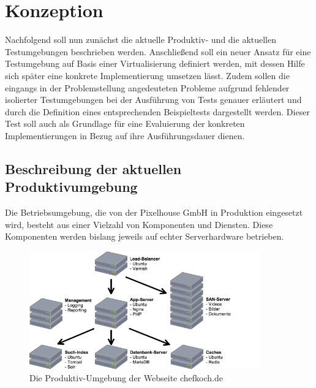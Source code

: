 \section{Konzeption}

Nachfolgend soll nun zunächst die aktuelle Produktiv- und die aktuellen Testumgebungen beschrieben werden. Anschließend soll ein neuer Ansatz für eine Testumgebung auf Basis einer Virtualisierung definiert werden, mit dessen Hilfe sich später eine konkrete Implementierung umsetzen lässt. Zudem sollen die eingangs in der Problemstellung angedeuteten Probleme aufgrund fehlender isolierter Testumgebungen bei der Ausführung von Tests genauer erläutert und durch die Definition eines entsprechenden Beispieltests dargestellt werden. Dieser Test soll auch als Grundlage für eine Evaluierung der konkreten Implementierungen in Bezug auf ihre Ausführungsdauer dienen.

\subsection{Beschreibung der aktuellen Produktivumgebung}

Die Betriebsumgebung, die von der Pixelhouse GmbH in Produktion eingesetzt wird, besteht aus einer Vielzahl von Komponenten und Diensten. Diese Komponenten werden bislang jeweils auf echter Serverhardware betrieben.

\begin{figure}[!ht]
  \begin{center}
    \includegraphics[width=10cm]{bilder/Produktiv-Umgebung.png}
    \caption{Die Produktiv-Umgebung der Webseite chefkoch.de}
  \end{center}
\end{figure}

